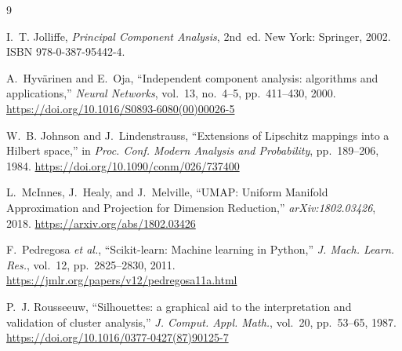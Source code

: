 \documentclass[conference]{IEEEtran}
\begin{document}
\begin{thebibliography}{9}

I.~T. Jolliffe,
\textit{Principal Component Analysis}, 2nd~ed.
New York: Springer, 2002.
ISBN 978-0-387-95442-4.

A.~Hyv\"{a}rinen and E.~Oja,
``Independent component analysis: algorithms and applications,''
\textit{Neural Networks}, vol.~13, no.~4--5, pp.~411--430, 2000.
\url{https://doi.org/10.1016/S0893-6080(00)00026-5}

W.~B. Johnson and J.~Lindenstrauss,
``Extensions of Lipschitz mappings into a Hilbert space,''
in \textit{Proc. Conf. Modern Analysis and Probability},
pp.~189--206, 1984.
\url{https://doi.org/10.1090/conm/026/737400}

L.~McInnes, J.~Healy, and J.~Melville,
``UMAP: Uniform Manifold Approximation and Projection for Dimension Reduction,''
\textit{arXiv:1802.03426}, 2018.
\url{https://arxiv.org/abs/1802.03426}

F.~Pedregosa \textit{et al.},
``Scikit-learn: Machine learning in Python,''
\textit{J. Mach. Learn. Res.}, vol.~12, pp.~2825--2830, 2011.
\url{https://jmlr.org/papers/v12/pedregosa11a.html}

P.~J. Rousseeuw,
``Silhouettes: a graphical aid to the interpretation and validation of cluster analysis,''
\textit{J. Comput. Appl. Math.}, vol.~20, pp.~53--65, 1987.
\url{https://doi.org/10.1016/0377-0427(87)90125-7}

\end{thebibliography}
\end{document}
